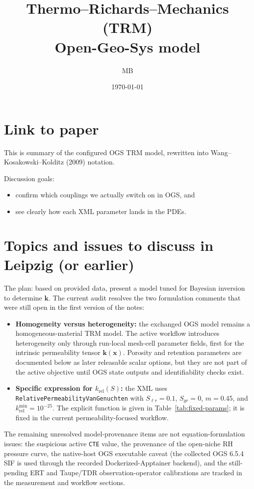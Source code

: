 \documentclass[10pt,a4paper]{article}
\title{Thermo--Richards--Mechanics (TRM)\\
\large Open-Geo-Sys model}
\author{MB}
\date{\today}
\newcommand{\Sat}{S}
\newcommand{\kperm}{\bm{k}}
\newcommand{\krel}{k_{\mathrm{rel}}(\Sat)}
\begin{document}
\maketitle

\section{Link to paper}
This is summary of the configured OGS TRM model, rewritten into Wang–Kosakowski–Kolditz (2009) notation. 

Discussion goals:
\begin{itemize}
    
\item[(i)] confirm which couplings we actually switch on in OGS, and

\item[(ii)] see clearly how each XML parameter lands in the PDEs.

\end{itemize}

\section{Topics and issues to discuss in Leipzig (or earlier)}
The plan: based on provided data, present a model tuned for Bayesian inversion to determine
$\kperm$.
The current audit resolves the two formulation comments that were still open in the
first version of the notes:
\begin{itemize}
    \item \textbf{Homogeneity versus heterogeneity:} the exchanged OGS model remains a
    homogeneous-material TRM model.  The active workflow introduces heterogeneity only
    through run-local mesh-cell parameter fields, first for the intrinsic permeability
    tensor \(\kperm(\bm x)\).  Porosity and retention parameters are documented below
    as later releasable scalar options, but they are not part of the active objective
    until OGS state outputs and identifiability checks exist.
    \item \textbf{Specific expression for \(\krel\):} the XML uses
    \texttt{RelativePermeabilityVanGenuchten} with
    \(S_{\ell r}=0.1\), \(S_{gr}=0\), \(m=0.45\), and
    \(k_{\mathrm{rel}}^{\min}=10^{-25}\).  The explicit function is given in
    Table~\ref{tab:fixed-params}; it is fixed in the current permeability-focused
    workflow.
\end{itemize}
The remaining unresolved model-provenance items are not equation-formulation issues:
the suspicious active \texttt{CTE} value, the provenance of the open-niche RH pressure
curve, the native-host OGS executable caveat (the collected OGS 6.5.4 SIF is used
through the recorded Dockerized-Apptainer backend), and the still-pending ERT and
Taupe/TDR observation-operator calibrations are tracked in the measurement and workflow
sections.
\end{document}
